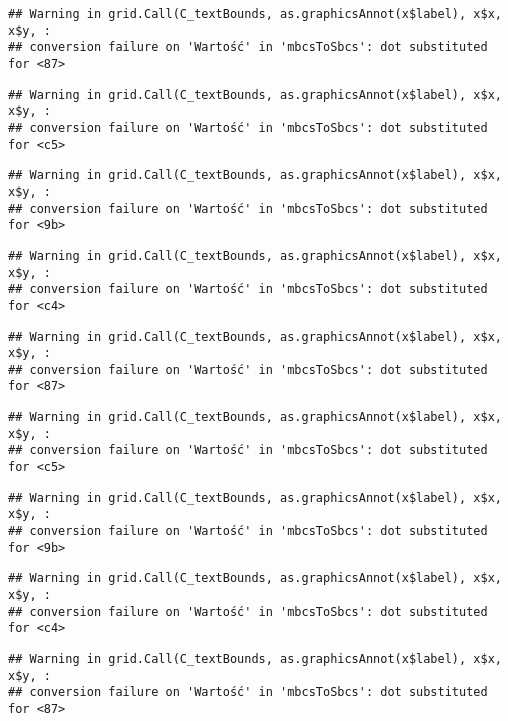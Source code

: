 \documentclass[
]{book}
\begin{document}
\begin{verbatim}
## Warning in grid.Call(C_textBounds, as.graphicsAnnot(x$label), x$x, x$y, :
## conversion failure on 'Wartość' in 'mbcsToSbcs': dot substituted for <87>
\end{verbatim}

\begin{verbatim}
## Warning in grid.Call(C_textBounds, as.graphicsAnnot(x$label), x$x, x$y, :
## conversion failure on 'Wartość' in 'mbcsToSbcs': dot substituted for <c5>
\end{verbatim}

\begin{verbatim}
## Warning in grid.Call(C_textBounds, as.graphicsAnnot(x$label), x$x, x$y, :
## conversion failure on 'Wartość' in 'mbcsToSbcs': dot substituted for <9b>
\end{verbatim}

\begin{verbatim}
## Warning in grid.Call(C_textBounds, as.graphicsAnnot(x$label), x$x, x$y, :
## conversion failure on 'Wartość' in 'mbcsToSbcs': dot substituted for <c4>
\end{verbatim}

\begin{verbatim}
## Warning in grid.Call(C_textBounds, as.graphicsAnnot(x$label), x$x, x$y, :
## conversion failure on 'Wartość' in 'mbcsToSbcs': dot substituted for <87>
\end{verbatim}

\begin{verbatim}
## Warning in grid.Call(C_textBounds, as.graphicsAnnot(x$label), x$x, x$y, :
## conversion failure on 'Wartość' in 'mbcsToSbcs': dot substituted for <c5>
\end{verbatim}

\begin{verbatim}
## Warning in grid.Call(C_textBounds, as.graphicsAnnot(x$label), x$x, x$y, :
## conversion failure on 'Wartość' in 'mbcsToSbcs': dot substituted for <9b>
\end{verbatim}

\begin{verbatim}
## Warning in grid.Call(C_textBounds, as.graphicsAnnot(x$label), x$x, x$y, :
## conversion failure on 'Wartość' in 'mbcsToSbcs': dot substituted for <c4>
\end{verbatim}

\begin{verbatim}
## Warning in grid.Call(C_textBounds, as.graphicsAnnot(x$label), x$x, x$y, :
## conversion failure on 'Wartość' in 'mbcsToSbcs': dot substituted for <87>
\end{verbatim}
\end{document}
